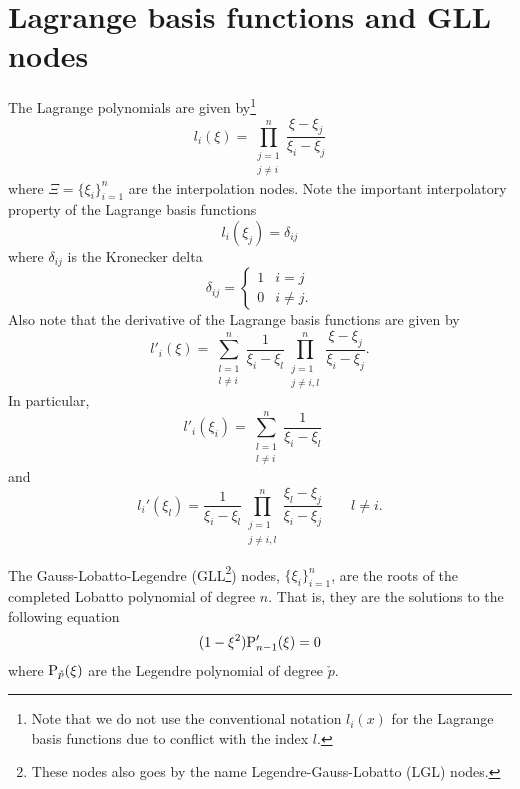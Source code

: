 \section{Lagrange basis functions and GLL nodes}
The Lagrange polynomials are given by\footnote{Note that we do not use the conventional notation $l_i(x)$ for the Lagrange basis functions due to conflict with the index $l$.}
\begin{equation*}
	l_i(\xi) = \prod_{\substack{j = 1 \\ j\neq i}}^n\frac{\xi-\xi_j}{\xi_i-\xi_j}
\end{equation*}
where $\Xi = \{\xi_i\}_{i=1}^n$ are the interpolation nodes. Note the important interpolatory property of the Lagrange basis functions
\begin{equation}\label{Eq5:LagrangeProperty}
	l_i(\xi_j) = \delta_{ij}
\end{equation}
where $\delta_{ij}$ is the Kronecker delta
\begin{equation*}
	\delta_{ij} = \begin{cases}
		1 & i = j\\
		0 & i \neq j.
	\end{cases}
\end{equation*}
Also note that the derivative of the Lagrange basis functions are given by
\begin{equation*}
	l'_i(\xi) = \sum_{\substack{l = 1\\l\neq i}}^n\frac{1}{\xi_i-\xi_l}\prod_{\substack{j = 1\\  j\neq i,l}}^n\frac{\xi-\xi_j}{\xi_i-\xi_j}.
\end{equation*}
In particular,
\begin{equation}\label{Eq5:derivativesAtNodes}
	l'_i(\xi_i) = \sum_{\substack{l=1\\l\neq i}}^n \frac{1}{\xi_i-\xi_l} \quad
\end{equation}
and
\begin{equation}\label{Eq5:derivativesAtNodes2}
	l_i'(\xi_l) = \frac{1}{\xi_i-\xi_l}\prod_{\substack{j = 1\\  j\neq i,l}}^n\frac{\xi_l-\xi_j}{\xi_i-\xi_j}\qquad l \neq i.
\end{equation}
\begin{definition}\label{Def:nodes}
The Gauss-Lobatto-Legendre (GLL\footnote{These nodes also goes by the name Legendre-Gauss-Lobatto (LGL) nodes.}) nodes, $\{\xi_i\}_{i=1}^n$, are the roots of the completed Lobatto polynomial of degree $n$. That is, they are the solutions to the following equation
	\begin{equation*} %
		(1-\xi^2)\legendre'_{n-1}(\xi) = 0
	\end{equation*}
	where $\mathrm{P}_{\check{p}}(\xi)$ are the Legendre polynomial of degree $\check{p}$.
\end{definition}

